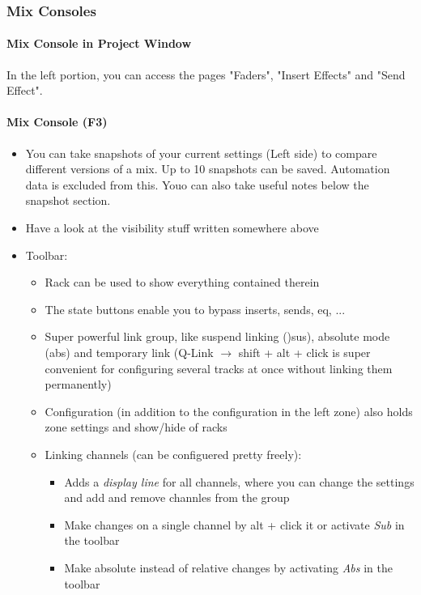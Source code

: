 \documentclass[10pt]{article}
\begin{document}
\subsubsection{Mix Consoles}

\paragraph{Mix Console in Project Window}

In the left portion, you can access the pages "Faders", "Insert Effects" and "Send Effect".

\paragraph{Mix Console (F3)}

\begin{itemize}
	\item You can take snapshots of your current settings (Left side) to compare different versions of a mix. Up to 10 snapshots can be saved. Automation data is excluded from this. Youo can also take useful notes below the snapshot section.
	\item Have a look at the visibility stuff written somewhere above
	\item Toolbar:
	\begin{itemize}
		\item Rack can be used to show everything contained therein
		\item The state buttons enable you to bypass inserts, sends, eq, ...
		\item Super powerful link group, like suspend linking ()sus), absolute mode (abs) and temporary link (Q-Link $\rightarrow$ shift + alt + click is super convenient for configuring several tracks at once without linking them permanently)
		\item Configuration (in addition to the configuration in the left zone) also holds zone settings and show/hide of racks
		\item Linking channels (can be configuered pretty freely):
		\begin{itemize}
			\item Adds a \textit{display line} for all channels, where you can change the settings and add and remove channles from the group
			\item Make changes on a single channel by alt + click it or activate \textit{Sub} in the toolbar
			\item Make absolute instead of relative changes by activating \textit{Abs} in the toolbar

\end{itemize}
\end{itemize}
\end{itemize}
\end{document}
